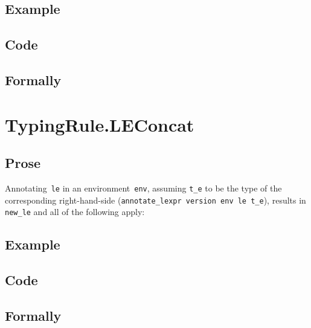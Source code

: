 \documentclass{book}
\begin{document}
  \subsection{Example}

  \subsection{Code}

\begin{emptyformal}
    \subsection{Formally}
\end{emptyformal}


\section{TypingRule.LEConcat \label{sec:TypingRule.LEConcat}}

    \subsection{Prose}
   Annotating~\texttt{le} in an environment~\texttt{env}, assuming
\texttt{t\_e} to be the type of the corresponding right-hand-side
(\texttt{annotate\_lexpr version env le t\_e}), results in \texttt{new\_le} and
all of the following apply:

  \subsection{Example}

  \subsection{Code}

\begin{emptyformal}
    \subsection{Formally}

\end{emptyformal}
\end{document}
